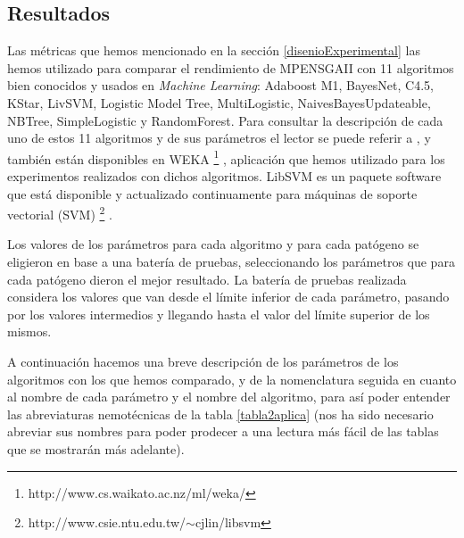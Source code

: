 \subsection{Resultados}
\noindent Las métricas que hemos mencionado en la sección \ref{disenioExperimental} las
hemos utilizado para comparar el rendimiento de MPENSGAII con 11 algoritmos bien conocidos
y usados en \textit{Machine Learning}: Adaboost M1, BayesNet, C4.5, KStar, LivSVM,
Logistic Model Tree, MultiLogistic, NaivesBayesUpdateable, NBTree, SimpleLogistic y
RandomForest. Para consultar la descripción de cada uno de estos 11 algoritmos y de sus parámetros
el lector se puede referir a \cite{Landwehr2005}, y también están disponibles en WEKA
\footnote{http://www.cs.waikato.ac.nz/ml/weka/} \cite{Witten2005}, aplicación que hemos
utilizado para los experimentos realizados con dichos algoritmos. LibSVM es un
paquete software que está disponible y actualizado continuamente para máquinas de soporte vectorial
(SVM) \footnote{http://www.csie.ntu.edu.tw/$\sim$cjlin/libsvm} \cite{Chang2001}.

Los valores de los parámetros para cada algoritmo y para cada patógeno se eligieron en
base a una batería de pruebas, seleccionando los parámetros que para cada patógeno dieron el mejor
resultado. La batería de pruebas realizada considera los valores que van desde el límite
inferior de cada parámetro, pasando por los valores intermedios y llegando hasta el valor del límite
superior de los mismos.

A continuación hacemos una breve descripción de los parámetros de los algoritmos con los
que hemos comparado, y de la nomenclatura seguida en cuanto al nombre de cada parámetro y
el nombre del algoritmo, para así poder entender las abreviaturas nemotécnicas de la tabla
\ref{tabla2aplica} (nos ha sido necesario abreviar sus nombres para poder prodecer a
una lectura más fácil de las tablas que se mostrarán más adelante).

